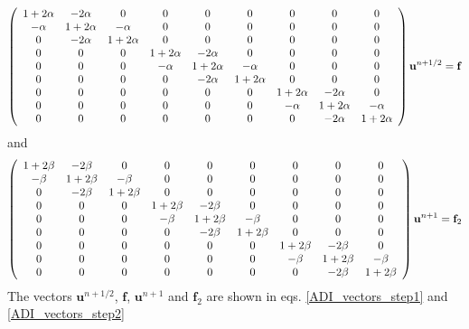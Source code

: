 \begin{align}
  \left(\begin{array}{c c c c c c c c c}
        1+2\alpha & -2\alpha &0 &0 &0 &0 &0 &0 &0\\
        -\alpha & 1+2\alpha & -\alpha &0 &0 &0 &0 &0 &0\\
        0& -2\alpha & 1+2\alpha & 0 & 0 & 0 &0&0&0\\
        0& 0&0 & 1+2\alpha & -2\alpha & 0 & 0 &0&0\\
        0& 0&0&-\alpha & 1+2\alpha & -\alpha & 0 & 0 &0\\
        0& 0&0&0&-2\alpha & 1+2\alpha & 0 & 0 &0\\
        0& 0 &0 &0 &0&0 & 1+2\alpha & -2\alpha&0\\
        0& 0 &0 &0 &0&0&-\alpha & 1+2\alpha &-\alpha\\
         0&0 &0 &0&0 &0&0&-2\alpha & 1+2\alpha
       \end{array}\right)\mathbf{u}^{n+1/2} = \mathbf{f}
\end{align}
and
\begin{align}
  \left(\begin{array}{c c c c c c c c c}
        1+2\beta & -2\beta &0 &0 &0 &0 &0 &0 &0\\
        -\beta & 1+2\beta & -\beta &0 &0 &0 &0 &0 &0\\
        0& -2\beta & 1+2\beta & 0 & 0 & 0 &0&0&0\\
        0& 0&0 & 1+2\beta & -2\beta & 0 & 0 &0&0\\
        0& 0&0&-\beta & 1+2\beta & -\beta & 0 & 0 &0\\
        0& 0&0&0&-2\beta & 1+2\beta & 0 & 0 &0\\
        0& 0 &0 &0 &0&0 & 1+2\beta & -2\beta&0\\
        0& 0 &0 &0 &0&0&-\beta & 1+2\beta &-\beta\\
         0&0 &0 &0&0 &0&0&-2\beta & 1+2\beta
       \end{array}\right)\mathbf{u}^{n+1} = \mathbf{f}_2
\end{align}
The vectors $\mathbf{u}^{n+1/2}$, $\mathbf{f}$, $\mathbf{u}^{n+1}$ and $\mathbf{f}_2$ are shown in eqs. \ref{ADI_vectors_step1} and \ref{ADI_vectors_step2}
